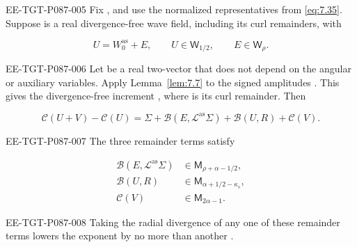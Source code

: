 \begin{corollary}\label{cor:7.8}
\begin{EESegment}{EE-TGT-P087-005}
Fix , and use the normalized representatives from
\eqref{eq:7.35}. Suppose  is a real divergence-free wave field, including
its curl remainders, with
\end{EESegment}
\[
  U=W_0^{\mathrm{as}}+E,
  \qquad U\in \mathsf W_{1/2},
  \qquad E\in \mathsf W_\rho.
\]
\begin{EESegment}{EE-TGT-P087-006}
Let  be a real two-vector that does not
depend on the angular or auxiliary variables. Apply Lemma~\ref{lem:7.7} to the signed amplitudes
. This gives the divergence-free increment
, where
 is its curl remainder. Then
\end{EESegment}
\begin{equation}
  \mathcal C(U+V)-\mathcal C(U)
  =\Sigma+\mathcal B(E,\mathcal L^{\mathrm{as}}\Sigma)
   +\mathcal B(U,R)+\mathcal C(V).
\tag{7.41}\label{eq:7.41}
\end{equation}
\begin{EESegment}{EE-TGT-P087-007}
The three remainder terms satisfy
\end{EESegment}
\begin{equation}
\begin{aligned}
  \mathcal B(E,\mathcal L^{\mathrm{as}}\Sigma)&\in \mathsf M_{\rho+\alpha-1/2},\\
  \mathcal B(U,R)&\in \mathsf M_{\alpha+1/2-\kappa_s},\\
  \mathcal C(V)&\in \mathsf M_{2\alpha-1}.
\end{aligned}
\tag{7.42}\label{eq:7.42}
\end{equation}
\begin{EESegment}{EE-TGT-P087-008}
Taking the radial divergence of any one of these remainder terms lowers the
 exponent by no more than another
.
\end{EESegment}
\end{corollary}

